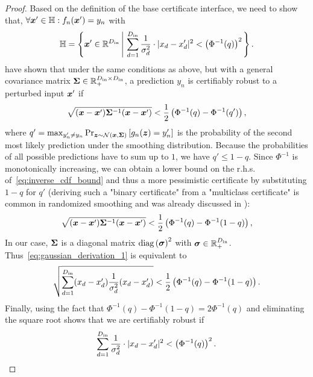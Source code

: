 \begin{proof}
Based on the definition of the base certificate interface, we need to show that, 
$\forall {\bm{x}}' \in {\mathbb{H}} : f_n({\bm{x}}') = y_n$ with
\begin{equation}
    \sH = \left\{ \vx' \in \sR^{D_\mathrm{in}} \left| \ 
        \sum_{d=1}^{D_\mathrm{in}}
            \frac{1}{\evsigma_d^2} \cdot | \evx_d - \evx'_d |^2 < \left( \Phi^{-1}(q) \right)^2
        \right.
    \right\}.
\end{equation}
\citet{Eiras2021} have shown that under the same conditions as above, but with a general covariance matrix ${\bm{\Sigma}} \in {\mathbb{R}}_+^{D_\mathrm{in} \times D_\mathrm{in}}$, a prediction $y_n$ is certifiably robust to a perturbed input ${\bm{x}}'$ if 
\begin{equation}\label{eq:inverse_cdf_bound}
    \sqrt{({\bm{x}} - {\bm{x}}') {\bm{\Sigma}}^{-1} ({\bm{x}} - {\bm{x}}')} < \frac{1}{2}
    \left(
        \Phi^{-1}(q) - \Phi^{-1}(q')
    \right),
\end{equation}
where $q' = \max_{{y}_n' \neq {y}_n} \Pr_{{\bm{z}} \sim \mathcal{N}({\bm{x}}, {\bm{\Sigma}})}\left[g_n({\bm{z}}) = {y}'_n \right]$ is the probability of the second most likely prediction under the smoothing distribution.
Because the probabilities of all possible predictions have to sum up to $1$, we have $q' \leq 1 - q$.
Since $\Phi^{-1}$ is monotonically increasing, we can obtain a lower bound on the r.h.s. of~\autoref{eq:inverse_cdf_bound} and thus a more pessimistic certificate by substituting $1 -q$ for $q'$ (deriving such a "binary certificate" from a "multiclass certificate" is common in randomized smoothing and was already discussed in \citep{Cohen2019}):
\begin{equation}\label{eq:gaussian_derivation_1}
    \sqrt{({\bm{x}} - {\bm{x}}') {\bm{\Sigma}}^{-1} ({\bm{x}} - {\bm{x}}')} < \frac{1}{2}
    \left(
        \Phi^{-1}(q) - \Phi^{-1}(1 - q)
    \right),
\end{equation}
In our case, ${\bm{\Sigma}}$ is a diagonal matrix $\mathrm{diag}\left({\bm{\sigma}}\right)^2$ with ${\bm{\sigma}} \in {\mathbb{R}}_+^{D_\mathrm{in}}$. Thus~\autoref{eq:gaussian_derivation_1} is equivalent to
\begin{equation}
    \sqrt{
        \sum_{d=1}^{D_\mathrm{in}} ({x}_d - {x}'_d) \frac{1}{{\sigma}_d^2} ({x}_d - {x}'_d)
    }
    < \frac{1}{2}
    \left(
        \Phi^{-1}(q) - \Phi^{-1}(1 - q)
    \right).
\end{equation}
Finally, using the fact that $\Phi^{-1}(q) - \Phi^{-1}(1 - q) = 2 \Phi^{-1}(q)$ and eliminating the square root shows that we are certifiably robust if 
\begin{equation}
    \sum_{d=1}^{D_\mathrm{in}} \frac{1}{{\sigma}_d^2} \cdot | {x}_d - {x}'_d |^2 < \left( \Phi^{-1}(q) \right)^2.
\end{equation}
\end{proof}


